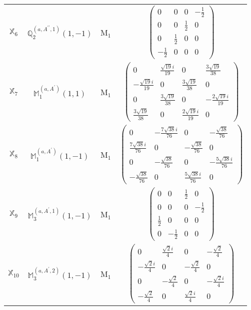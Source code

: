 \documentclass[fleqn,10pt,landscape]{article}
\begin{document}
\begin{itemize}
\begin{center}
\begin{longtable}{c|c|c|c}
$ \mathbb{X}_{6} $ & $\mathbb{Q}_{2}^{(a,A^{\prime\prime},1)}(1,-1)$ & M$_{1}$ & $\begin{pmatrix} 0 & 0 & 0 & - \frac{1}{2} \\ 0 & 0 & \frac{1}{2} & 0 \\ 0 & \frac{1}{2} & 0 & 0 \\ - \frac{1}{2} & 0 & 0 & 0 \end{pmatrix}$ \\
$ \mathbb{X}_{7} $ & $\mathbb{M}_{1}^{(a,A^{\prime})}(1,1)$ & M$_{1}$ & $\begin{pmatrix} 0 & \frac{\sqrt{19} i}{19} & 0 & \frac{3 \sqrt{19}}{38} \\ - \frac{\sqrt{19} i}{19} & 0 & \frac{3 \sqrt{19}}{38} & 0 \\ 0 & \frac{3 \sqrt{19}}{38} & 0 & - \frac{2 \sqrt{19} i}{19} \\ \frac{3 \sqrt{19}}{38} & 0 & \frac{2 \sqrt{19} i}{19} & 0 \end{pmatrix}$ \\
$ \mathbb{X}_{8} $ & $\mathbb{M}_{1}^{(a,A^{\prime})}(1,-1)$ & M$_{1}$ & $\begin{pmatrix} 0 & - \frac{7 \sqrt{38} i}{76} & 0 & - \frac{\sqrt{38}}{76} \\ \frac{7 \sqrt{38} i}{76} & 0 & - \frac{\sqrt{38}}{76} & 0 \\ 0 & - \frac{\sqrt{38}}{76} & 0 & - \frac{5 \sqrt{38} i}{76} \\ - \frac{\sqrt{38}}{76} & 0 & \frac{5 \sqrt{38} i}{76} & 0 \end{pmatrix}$ \\
$ \mathbb{X}_{9} $ & $\mathbb{M}_{3}^{(a,A^{\prime},1)}(1,-1)$ & M$_{1}$ & $\begin{pmatrix} 0 & 0 & \frac{1}{2} & 0 \\ 0 & 0 & 0 & - \frac{1}{2} \\ \frac{1}{2} & 0 & 0 & 0 \\ 0 & - \frac{1}{2} & 0 & 0 \end{pmatrix}$ \\
$ \mathbb{X}_{10} $ & $\mathbb{M}_{3}^{(a,A^{\prime},2)}(1,-1)$ & M$_{1}$ & $\begin{pmatrix} 0 & \frac{\sqrt{2} i}{4} & 0 & - \frac{\sqrt{2}}{4} \\ - \frac{\sqrt{2} i}{4} & 0 & - \frac{\sqrt{2}}{4} & 0 \\ 0 & - \frac{\sqrt{2}}{4} & 0 & - \frac{\sqrt{2} i}{4} \\ - \frac{\sqrt{2}}{4} & 0 & \frac{\sqrt{2} i}{4} & 0 \end{pmatrix}$ \\

\end{longtable}
\end{center}
\end{itemize}
\end{document}
